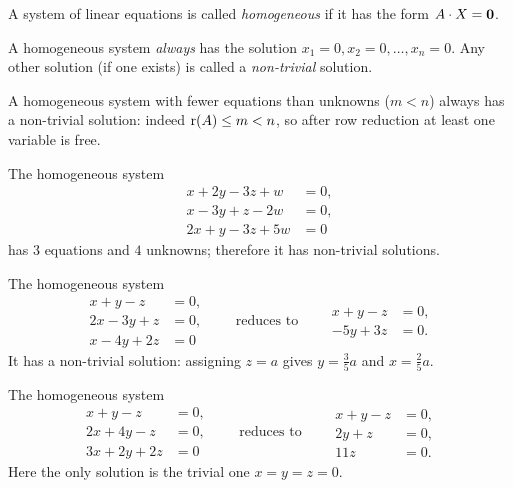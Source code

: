 \begin{definition}
A system of linear equations is called \emph{homogeneous} if it has the form $A\cdot X = \mathbf{0}$.
\end{definition}

\noindent A homogeneous system \emph{always} has the solution $x_1=0, x_2=0,\ldots,x_n=0$. Any other solution
(if one exists) is called a \emph{non-trivial} solution.

\begin{fact}
A homogeneous system with fewer equations than unknowns ($m<n$) always has a non-trivial solution: indeed
$\operatorname{r}(A)\leq m<n$, so after row reduction at least one variable is free.
\end{fact}

\begin{example}
The homogeneous system
\[
\begin{aligned}
x+2y-3z+w &= 0,\\ x-3y +z -2w &=0,\\ 2x+y-3z+5w &= 0
\end{aligned}
\]
has $3$ equations and $4$ unknowns; therefore it has non-trivial solutions.
\end{example}

\begin{example}
The homogeneous system
\[
\begin{aligned}
x+y-z &= 0,\\ 2x-3y+z &=0,\\ x-4y+2z &= 0
\end{aligned}
\qquad\text{reduces to}\qquad
\begin{aligned}
x+y-z &= 0,\\ -5y+3z &= 0.
\end{aligned}
\]
It has a non-trivial solution: assigning $z=a$ gives $y=\tfrac{3}{5}a$ and $x=\tfrac{2}{5}a$.
\end{example}

\begin{example}
The homogeneous system
\[
\begin{aligned}
x+y-z &= 0,\\ 2x+4y-z &=0,\\ 3x+2y+2z &= 0
\end{aligned}
\qquad\text{reduces to}\qquad
\begin{aligned}
x+y-z &= 0,\\ 2y+z &= 0,\\ 11z &= 0.
\end{aligned}
\]
Here the only solution is the trivial one $x=y=z=0$.
\end{example}

